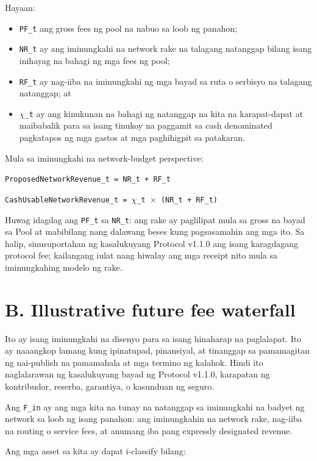 \documentclass[11pt]{article}
\begin{document}
Hayaan:

\begin{itemize}[leftmargin=*]
\item \texttt{PF\_t} ang gross fees ng pool na nabuo sa loob ng panahon;
\item \texttt{NR\_t} ay ang iminungkahi na network rake na talagang natanggap bilang isang inihayag na bahagi ng mga fees ng pool;
\item \texttt{RF\_t} ay nag-iiba na iminungkahi ng mga bayad sa ruta o serbisyo na talagang natanggap; at
\item \texttt{$\chi$\_t} ay ang kinukunan na bahagi ng natanggap na kita na karapat-dapat at maibabalik para sa isang tinukoy na paggamit sa cash denominated pagkatapos ng mga gastos at mga paghihigpit sa patakaran.
\end{itemize}
Mula sa iminungkahi na network-budget perspective:

\texttt{ProposedNetworkRevenue\_t = NR\_t + RF\_t}

\texttt{CashUsableNetworkRevenue\_t = $\chi$\_t $\times$ (NR\_t + RF\_t)}

Huwag idagdag ang \texttt{PF\_t} sa \texttt{NR\_t}: ang rake ay paglilipat mula sa gross na bayad sa Pool at mabibilang nang dalawang beses kung pagsasamahin ang mga ito. Sa halip, sinusuportahan ng kasalukuyang Protocol v1.1.0 ang isang karagdagang protocol fee; kailangang iulat nang hiwalay ang mga receipt nito mula sa iminungkahing modelo ng rake.


\section*{B. Illustrative future fee waterfall}

Ito ay isang iminungkahi na disenyo para sa isang hinaharap na paglalapat. Ito ay naaangkop lamang kung ipinatupad, pinansiyal, at tinanggap sa pamamagitan ng nai-publish na pamamahala at mga termino ng kalahok. Hindi ito naglalarawan ng kasalukuyang bayad ng Protocol v1.1.0, karapatan ng kontribudor, reserba, garantiya, o kasunduan ng seguro.

Ang \texttt{F\_in} ay ang mga kita na tunay na natanggap sa iminungkahi na badyet ng network sa loob ng isang panahon: ang iminungkahin na network rake, nag-iiba na routing o service fees, at anumang iba pang expressly designated revenue.

Ang mga asset sa kita ay dapat i-classify bilang:
\end{document}
